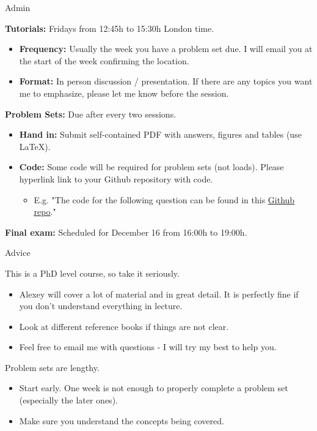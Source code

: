 \begin{frame}{Admin}

    \textbf{Tutorials:} Fridays from 12:45h to 15:30h London time.
    \begin{itemize}
        \item \textbf{Frequency:} Usually the week you have a problem set due. I will email you at the start of the week confirming the location.
        \item \textbf{Format:} In person discussion / presentation. If there are any topics you want me to emphasize, please let me know before the session.
    \end{itemize}
    
    \vspace{2em}
    
    \textbf{Problem Sets:} Due after every two sessions.
    \begin{itemize}
        \item \textbf{Hand in:} Submit self-contained PDF with answers, figures and tables (use \LaTeX).
        \item \textbf{Code:} Some code will be required for problem sets (not loads). Please hyperlink link to your Github repository with code.
        \begin{itemize}
            \item E.g. "The code for the following question can be found in this \href{https://github.com/gabrielsgaspar/P218-Econometrics}{\underline{Github repo}}."
        \end{itemize}
    \end{itemize}

    \vspace{2em}
    
    \textbf{Final exam:} Scheduled for December 16 from 16:00h to 19:00h.
    
\end{frame}
\begin{frame}{Advice}

    This is a PhD level course, so take it seriously.
    \begin{itemize}
        \item Alexey will cover a lot of material and in great detail. It is perfectly fine if you don't understand everything in lecture.
        \item Look at different reference books if things are not clear.
        \item Feel free to email me with questions - I will try my best to help you.
    \end{itemize}

    \vspace{2em}
    
    Problem sets are lengthy.
    \begin{itemize}
        \item Start early. One week is not enough to properly complete a problem set (especially the later ones).
        \item Make sure you understand the concepts being covered.
    \end{itemize}
    
\end{frame}